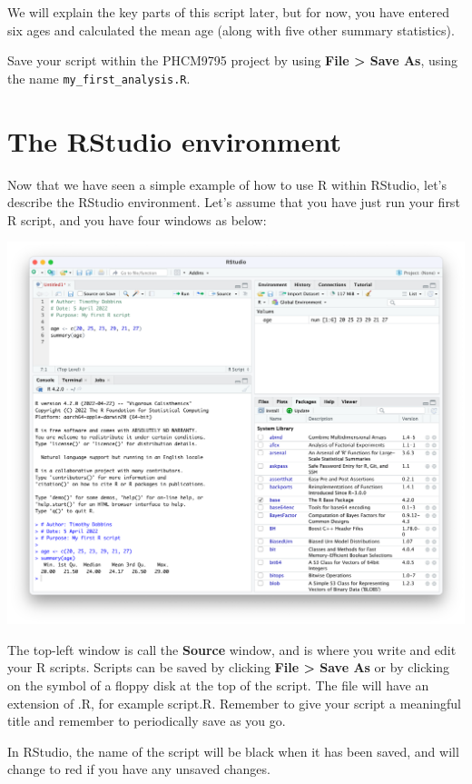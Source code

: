 \documentclass[
]{memoir}
\begin{document}
We will explain the key parts of this script later, but for now, you have entered six ages and calculated the mean age (along with five other summary statistics).

Save your script within the PHCM9795 project by using \textbf{File \textgreater{} Save As}, using the name \texttt{my\_first\_analysis.R}.

\hypertarget{the-rstudio-environment}{%
\section{The RStudio environment}\label{the-rstudio-environment}}

Now that we have seen a simple example of how to use R within RStudio, let's describe the RStudio environment. Let's assume that you have just run your first R script, and you have four windows as below:

\includegraphics[width=1\linewidth]{img/RStudio-screenshot-03}

The top-left window is call the \textbf{Source} window, and is where you write and edit your R scripts. Scripts can be saved by clicking \textbf{File \textgreater{} Save As} or by clicking on the symbol of a floppy disk at the top of the script. The file will have an extension of .R, for example script.R. Remember to give your script a meaningful title and remember to periodically save as you go.

In RStudio, the name of the script will be black when it has been saved, and will change to red if you have any unsaved changes.
\end{document}
